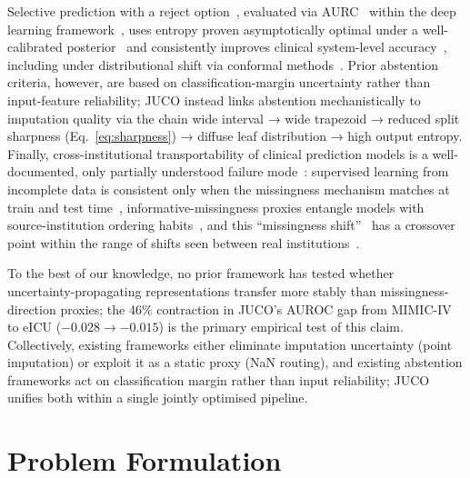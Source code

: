 \documentclass[journal]{IEEEtran}
\begin{document}
Selective prediction with a reject option~\cite{chow1957optimum,bartlett2008classification}, evaluated via AURC~\cite{geifman2019bias} within the deep learning framework~\cite{geifman2017selective}, uses entropy proven asymptotically optimal under a well-calibrated posterior~\cite{franc2023optimal} and consistently improves clinical system-level accuracy~\cite{leibig2017leveraging,jones2021selective}, including under distributional shift via conformal methods~\cite{kwon2026conformal}. Prior abstention criteria, however, are based on classification-margin uncertainty rather than input-feature reliability; JUCO instead links abstention mechanistically to imputation quality via the chain wide interval → wide trapezoid → reduced split sharpness (Eq.~\ref{eq:sharpness}) → diffuse leaf distribution → high output entropy. Finally, cross-institutional transportability of clinical prediction models is a well-documented, only partially understood failure mode~\cite{moons2012risk}: supervised learning from incomplete data is consistent only when the missingness mechanism matches at train and test time~\cite{josse2019consistency}, informative-missingness proxies entangle models with source-institution ordering habits~\cite{sperrin2020informative}, and this ``missingness shift''~\cite{rockenschaub2024robust} has a crossover point within the range of shifts seen between real institutions~\cite{mesinovic2025explainable,sarwar2026systematic}.
	
	To the best of our knowledge, no prior framework has tested whether uncertainty-propagating representations transfer more stably than missingness-direction proxies; the 46\% contraction in JUCO's AUROC gap from MIMIC-IV to eICU ($-0.028 \to -0.015$) is the primary empirical test of this claim. Collectively, existing frameworks either eliminate imputation uncertainty (point imputation) or exploit it as a static proxy (NaN routing), and existing abstention frameworks act on classification margin rather than input reliability; JUCO unifies both within a single jointly optimised pipeline.
	
	
	\section{Problem Formulation}
	\label{sec:problem_formulation}
	\label{sec:mnar_problem}
	\label{sec:formal_problem}
	
\end{document}
